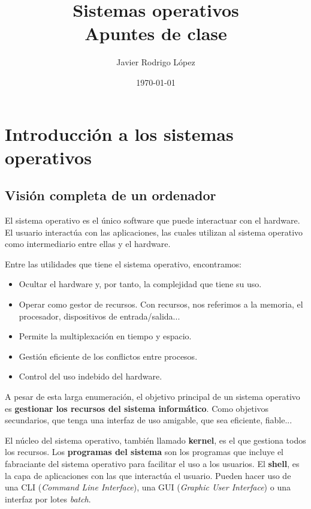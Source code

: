 \documentclass[10pt]{book}
\title{\Huge Sistemas operativos\\\huge Apuntes de clase}
\author{Javier Rodrigo López}
\date{\today}
\begin{document}
\maketitle

\tableofcontents


\newpage

\newpage

\chapter{Introducción a los sistemas operativos}

\section{Visión completa de un ordenador}

El sistema operativo es el único software que puede interactuar con el hardware. El usuario interactúa con las aplicaciones, las cuales utilizan al sistema operativo como intermediario entre ellas y el hardware.

Entre las utilidades que tiene el sistema operativo, encontramos:
\begin{itemize}
  \item Ocultar el hardware y, por tanto, la complejidad que tiene su uso.
  \item Operar como gestor de recursos. Con recursos, nos referimos a la memoria, el procesador, dispositivos de entrada/salida...
  \item Permite la multiplexación en tiempo y espacio.
  \item Gestión eficiente de los conflictos entre procesos.
  \item Control del uso indebido del hardware.
\end{itemize}

A pesar de esta larga enumeración, el objetivo principal de un sistema operativo es \textbf{gestionar los recursos del sistema informático}. Como objetivos secundarios, que tenga una interfaz de uso amigable, que sea eficiente, fiable...

El núcleo del sistema operativo, también llamado \textbf{kernel}, es el que gestiona todos los recursos. Los \textbf{programas del sistema} son los programas que incluye el fabraciante del sistema operativo para facilitar el uso a los usuarios. El \textbf{shell}, es la capa de aplicaciones con las que interactúa el usuario. Pueden hacer uso de una CLI (\textit{Command Line Interface}), una GUI (\textit{Graphic User Interface}) o una interfaz por lotes \textit{batch}.
\end{document}
